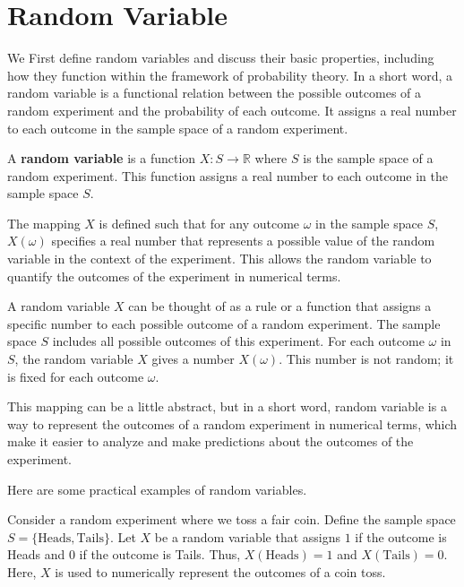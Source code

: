 \section{Random Variable}
We First define random variables and discuss their basic properties, including how they function within the framework of probability theory.
In a short word, a random variable is a functional relation between the possible outcomes of a random experiment
and the probability of each outcome. It assigns a real number to each outcome in the sample space of a random experiment.
\begin{definition}
    A \textbf{random variable} is a function \( X: S \rightarrow \mathbb{R} \) 
    where \( S \) is the sample space of a random experiment. This function 
    assigns a real number to each outcome in the sample space \( S \). 
    
    The mapping \( X \) is defined such that for any outcome \( \omega \) 
    in the sample space \( S \), \( X(\omega) \) specifies a real number 
    that represents a possible value of the random variable in the context 
    of the experiment. This allows the random variable to quantify 
    the outcomes of the experiment in numerical terms.
\end{definition}

A random variable \( X \) can be thought of as a rule or a function that assigns 
a specific number to each possible outcome of a random experiment. The sample 
space \( S \) includes all possible outcomes of this experiment. For each 
outcome \( \omega \) in \( S \), the random variable \( X \) gives a number 
\( X(\omega) \). This number is not random; it is fixed for each outcome 
\( \omega \).

This mapping can be a little abstract, but in a short word, random variable is a way to represent 
the outcomes of a random experiment in numerical terms, which make it easier to analyze and make predictions about the outcomes of the experiment.

Here are some practical examples of random variables.
\begin{example}
    Consider a random experiment where we toss a fair coin. Define the sample space 
    \( S = \{\text{Heads}, \text{Tails}\} \). Let \( X \) be a random variable that 
    assigns \( 1 \) if the outcome is Heads and \( 0 \) if the outcome is Tails. Thus, 
    \( X(\text{Heads}) = 1 \) and \( X(\text{Tails}) = 0 \). Here, \( X \) is used to 
    numerically represent the outcomes of a coin toss.
    \end{example}
    
